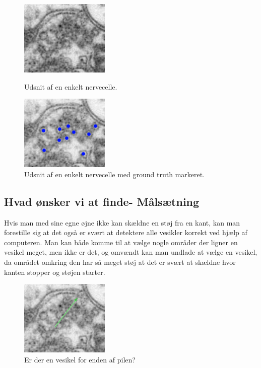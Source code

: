 \begin{figure}[H]
	\begin{minipage}[b]{0.5\linewidth}
		\centering
		\includegraphics[scale=1.5]{files/intro/img/celle.png}
		\caption{Udsnit af en enkelt nervecelle.\label{fig:intro_celle}}
	\end{minipage}
	\hspace{0.5cm}
	\begin{minipage}[b]{0.5\linewidth}
		\centering
		\includegraphics[scale=1.5]{files/intro/img/celle_groundtruth.png}
		\caption{Udsnit af en enkelt nervecelle med ground truth markeret.\label{fig:intro_celle_groundtruth}}
	\end{minipage}
\end{figure}
  

\subsection{Hvad ønsker vi at finde- Målsætning}			%
Hvis man med sine egne øjne ikke kan skældne en støj fra en kant, kan man forestille sig at det også er svært at detektere alle vesikler korrekt ved hjælp af computeren. Man kan både komme til at vælge nogle områder der ligner en vesikel meget, men ikke er det, og omvændt kan man undlade at vælge en vesikel, da området omkring den har så meget støj at det er svært at skældne hvor kanten stopper og støjen starter. 

\begin{figure}[H]
	\centering
	\includegraphics[scale=1.5]{files/intro/img/celle_questionves.png}
	\caption{Er der en vesikel for enden af pilen?\label{fig:intro_celle_question}}
\end{figure}

